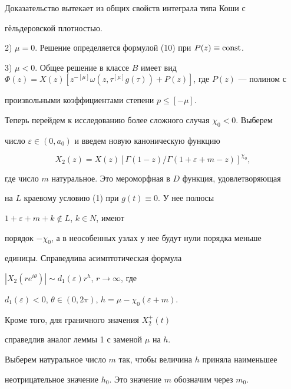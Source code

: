  


Доказательство вытекает из общих свойств интеграла типа Коши с 


г\"ельдеровской плотностью. 


 


2) $\mu=0$. Решение определяется формулой (10) при $P(z)\equiv\operatorname{const}$. 


 


3) $\mu<0$. Общее решение в классе $B$ имеет вид $\Phi(z)=X(z) 


[z^{-[\mu]}\omega(z,\tau^{[\mu]}g(\tau))+P(z)]$, где $P(z)$ --- полином с 


произвольными коэффициентами степени $p\le[-\mu]$. 


 


Теперь перейдем к исследованию более сложного случая $\chi_0<0$. Выберем 


число $\varepsilon\in(0,a_0)$ и введем новую каноническую функцию 


\begin{equation} 


X_2(z)=X(z)[\Gamma(1-z)/\Gamma(1+\varepsilon+m-z)]^{\chi_0}, 


\end{equation} 


где число $m$ натуральное. Это мероморфная в $D$ функция, удовлетворяющая 


на $L$ краевому условию (1) при $g(t)\equiv0$. У нее полюсы 


$1+\varepsilon+m+k\notin L$, $k\in N$, имеют 


порядок $-\chi_0$, а в неособенных узлах у нее будут нули порядка меньше


единицы. Справедлива асимптотическая формула 


$|X_2(re^{i\theta})|\sim d_1(\varepsilon)r^h$, $r\to\infty$, где 


$d_1(\varepsilon)<0$, $\theta\in(0,2\pi)$, $h=\mu-\chi_0(\varepsilon+m)$. 


Кроме того, для граничного значения $X^+_2(t)$ 


справедлив аналог леммы 1 с заменой $\mu$ на $h$. 


 


Выберем натуральное число $m$ так, чтобы величина $h$ приняла наименьшее 


неотрицательное значение $h_0$. Это значение $m$ обозначим через $m_0$. 


